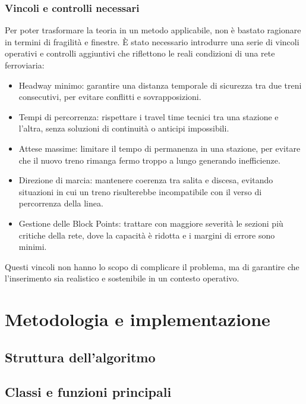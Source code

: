 \documentclass[a4paper,12pt]{report}
\begin{document}
\subsection{Vincoli e controlli necessari}
Per poter trasformare la teoria in un metodo applicabile, non è bastato ragionare in termini di fragilità e finestre. È stato necessario introdurre una serie di vincoli operativi e controlli aggiuntivi che riflettono le reali condizioni di una rete ferroviaria:
\begin{itemize}

\item Headway minimo: garantire una distanza temporale di sicurezza tra due treni consecutivi, per evitare conflitti e sovrapposizioni.

\item Tempi di percorrenza: rispettare i travel time tecnici tra una stazione e l’altra, senza soluzioni di continuità o anticipi impossibili.

\item Attese massime: limitare il tempo di permanenza in una stazione, per evitare che il nuovo treno rimanga fermo troppo a lungo generando inefficienze.

\item Direzione di marcia: mantenere coerenza tra salita e discesa, evitando situazioni in cui un treno risulterebbe incompatibile con il verso di percorrenza della linea.

\item Gestione delle Block Points: trattare con maggiore severità le sezioni più critiche della rete, dove la capacità è ridotta e i margini di errore sono minimi.

\end{itemize}
Questi vincoli non hanno lo scopo di complicare il problema, ma di garantire che l’inserimento sia realistico e sostenibile in un contesto operativo.





\chapter{Metodologia e implementazione}
\section{Struttura dell’algoritmo}
\section{Classi e funzioni principali}
\end{document}
